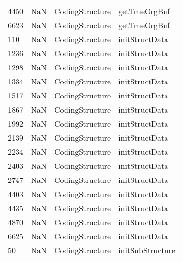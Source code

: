 \begin{tabular}{llll}
4450 &                   NaN &            CodingStructure &                             getTrueOrgBuf \\
6623 &                   NaN &            CodingStructure &                             getTrueOrgBuf \\
110  &                   NaN &            CodingStructure &                            initStructData \\
1236 &                   NaN &            CodingStructure &                            initStructData \\
1298 &                   NaN &            CodingStructure &                            initStructData \\
1334 &                   NaN &            CodingStructure &                            initStructData \\
1517 &                   NaN &            CodingStructure &                            initStructData \\
1867 &                   NaN &            CodingStructure &                            initStructData \\
1992 &                   NaN &            CodingStructure &                            initStructData \\
2139 &                   NaN &            CodingStructure &                            initStructData \\
2234 &                   NaN &            CodingStructure &                            initStructData \\
2403 &                   NaN &            CodingStructure &                            initStructData \\
2747 &                   NaN &            CodingStructure &                            initStructData \\
4403 &                   NaN &            CodingStructure &                            initStructData \\
4435 &                   NaN &            CodingStructure &                            initStructData \\
4870 &                   NaN &            CodingStructure &                            initStructData \\
6625 &                   NaN &            CodingStructure &                            initStructData \\
50   &                   NaN &            CodingStructure &                          initSubStructure \\

\end{tabular}
